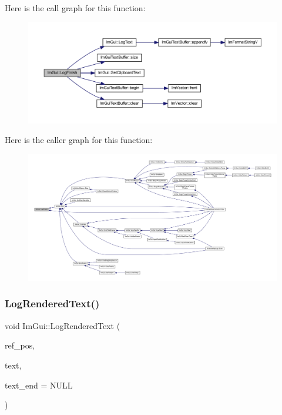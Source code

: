 Here is the call graph for this function\+:
\nopagebreak
\begin{figure}[H]
\begin{center}
\leavevmode
\includegraphics[width=350pt]{namespace_im_gui_a2ebcd048d1ca025fb972e1c2e920e3f3_cgraph}
\end{center}
\end{figure}
Here is the caller graph for this function\+:
\nopagebreak
\begin{figure}[H]
\begin{center}
\leavevmode
\includegraphics[width=350pt]{namespace_im_gui_a2ebcd048d1ca025fb972e1c2e920e3f3_icgraph}
\end{center}
\end{figure}
\mbox{\label{namespace_im_gui_a7a0d62e33f2236ec2f789e24ca0fb56f}} 
\subsubsection{\texorpdfstring{Log\+Rendered\+Text()}{LogRenderedText()}}
{\footnotesize\ttfamily void Im\+Gui\+::\+Log\+Rendered\+Text (\begin{DoxyParamCaption}\item[{const \mbox{\hyperlink{struct_im_vec2}{Im\+Vec2}} $\ast$}]{ref\+\_\+pos,  }\item[{const char $\ast$}]{text,  }\item[{const char $\ast$}]{text\+\_\+end = {\ttfamily NULL} }\end{DoxyParamCaption})}

